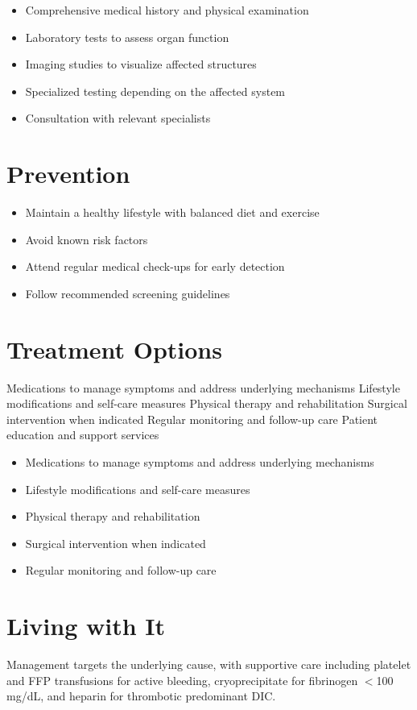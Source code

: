 \begin{itemize}[noitemsep]
  \item Comprehensive medical history and physical examination
  \item Laboratory tests to assess organ function
  \item Imaging studies to visualize affected structures
  \item Specialized testing depending on the affected system
  \item Consultation with relevant specialists
\end{itemize}
\section{Prevention}
\begin{itemize}[noitemsep]
  \item Maintain a healthy lifestyle with balanced diet and exercise
  \item Avoid known risk factors
  \item Attend regular medical check-ups for early detection
  \item Follow recommended screening guidelines
\end{itemize}
\section{Treatment Options}
Medications to manage symptoms and address underlying mechanisms Lifestyle modifications and self-care measures Physical therapy and rehabilitation Surgical intervention when indicated Regular monitoring and follow-up care Patient education and support services

\begin{itemize}[noitemsep]
  \item Medications to manage symptoms and address underlying mechanisms
  \item Lifestyle modifications and self-care measures
  \item Physical therapy and rehabilitation
  \item Surgical intervention when indicated
  \item Regular monitoring and follow-up care
\end{itemize}
\section{Living with It}
Management targets the underlying cause, with supportive care including platelet and FFP transfusions for active bleeding, cryoprecipitate for fibrinogen $<$100 mg/dL, and heparin for thrombotic predominant DIC.

